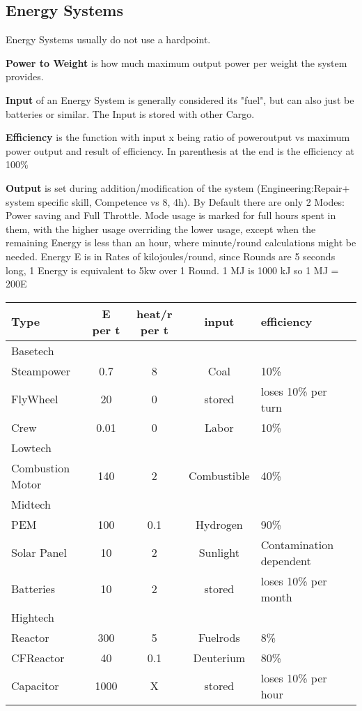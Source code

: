\subsection{Energy Systems}\label{subsec:energy-systems}
Energy Systems usually do not use a hardpoint.

\textbf{Power to Weight} is how much maximum output power per weight the system provides.

\textbf{Input} of an Energy System is generally considered its "fuel", but can also just be batteries or similar.
The Input is stored with other Cargo.

\textbf{Efficiency} is the function with input x being ratio of poweroutput vs maximum power output and result of
efficiency.
In parenthesis at the end is the efficiency at 100\%

\textbf{Output} is set during addition/modification of the system
(Engineering:Repair+ system specific skill, Competence vs 8, 4h).
By Default there are only 2 Modes: Power saving and Full Throttle.
Mode usage is marked for full hours spent in them, with the higher usage overriding the lower usage, except when the
remaining Energy is less than an hour, where minute/round calculations might be needed.
Energy E is in Rates of kilojoules/round, since Rounds are 5 seconds long, 1 Energy is equivalent to 5kw over 1 Round.
1 MJ is 1000 kJ so 1 MJ = 200E

\begin{tabular}{l|cccl}
    Type & E per t & heat/r per t & input & efficiency\\
    \hline Basetech \\
    Steampower & 0.7 & 8 & Coal & 10\%\\
    FlyWheel & 20 & 0 & stored & loses 10\% per turn \\
    Crew & 0.01 & 0 & Labor & 10\%\\
    \hline Lowtech \\
    Combustion Motor& 140 & 2  & Combustible & 40\% \\
    \hline Midtech \\
    PEM & 100 & 0.1 & Hydrogen & 90\%\\
    Solar Panel & 10 & 2 & Sunlight & Contamination dependent\\
    Batteries & 10 & 2 & stored & loses 10\% per month \\
    \hline Hightech \\
    Reactor & 300 & 5  & Fuelrods & 8\%\\
    CFReactor & 40 & 0.1  & Deuterium & 80\%\\
    Capacitor & 1000 & X & stored & loses 10\% per hour
\end{tabular}


